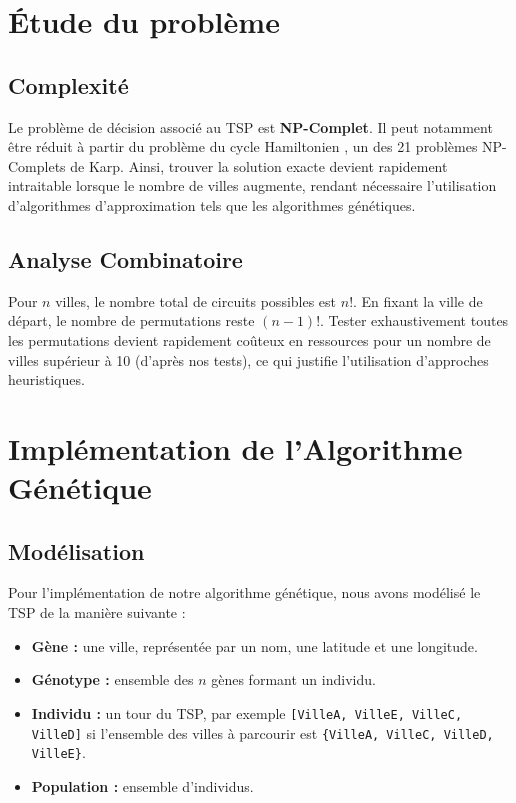 \documentclass[a4paper,12pt]{article}
\begin{document}
\section{Étude du problème}
\subsection{Complexité}
Le problème de décision associé au TSP est \cite{np_completude}
\textbf{NP-Complet}. Il peut notamment être réduit à partir du problème du cycle Hamiltonien \cite{cycle_hamiltonien}, un des 21 problèmes NP-Complets de Karp.
Ainsi, trouver la solution exacte devient rapidement intraitable lorsque le nombre de villes augmente, rendant nécessaire l'utilisation d'algorithmes d'approximation tels que les algorithmes génétiques.

\subsection{Analyse Combinatoire}
Pour $n$ villes, le nombre total de circuits possibles est $n!$.  
En fixant la ville de départ, le nombre de permutations reste $(n-1)!$.  
Tester exhaustivement toutes les permutations devient rapidement coûteux en ressources pour un nombre de villes supérieur à 10 (d'après nos tests), ce qui justifie l'utilisation d'approches heuristiques.

\section{Implémentation de l'Algorithme Génétique}

\subsection{Modélisation}
Pour l'implémentation de notre algorithme génétique, nous avons modélisé le TSP de la manière suivante :
\begin{itemize}
    \item \textbf{Gène :} une ville, représentée par un nom, une latitude et une longitude.
    \item \textbf{Génotype :} ensemble des $n$ gènes formant un individu.
    \item \textbf{Individu :} un tour du TSP, par exemple \verb|[VilleA, VilleE, VilleC, VilleD]| si l'ensemble des villes à parcourir est \verb|{VilleA, VilleC, VilleD, VilleE}|.
    \item \textbf{Population :} ensemble d'individus.
\end{itemize}
\end{document}
